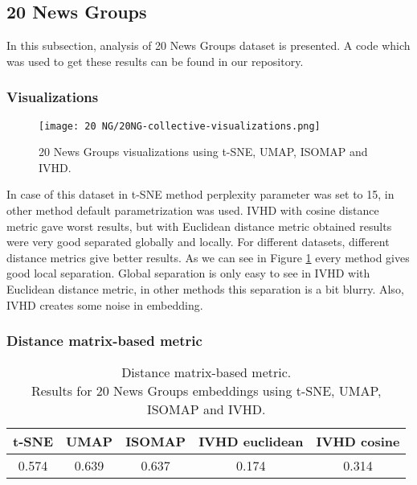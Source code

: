 \documentclass[12pt]{article}
\begin{document}
\clearpage
\subsection{20 News Groups}
In this subsection, analysis of 20 News Groups dataset is presented. A code which was used to get these results can be found in our repository\cite{github-20ng}.
\subsubsection{Visualizations}
\begin{figure}[h]
    \centering
    \texttt{[image: 20 NG/20NG-collective-visualizations.png]}
    \caption{20 News Groups visualizations using t-SNE, UMAP, ISOMAP and IVHD.}
    \label{fig:20ng_vis}
\end{figure}

\clearpage
In case of this dataset in t-SNE method perplexity parameter was set to 15, in other method default parametrization was used. IVHD with cosine distance metric gave worst results, but with Euclidean distance metric obtained results were very good separated globally and locally. For different datasets, different distance metrics give better results. As we can see in Figure \ref{fig:20ng_vis} every method gives good local separation. Global separation is only easy to see in IVHD with Euclidean distance metric, in other methods this separation is a bit blurry. Also, IVHD creates some noise in embedding.

\subsubsection{Distance matrix-based metric}
\begin{table}[h]
\centering
\caption{Distance matrix-based metric. \\ Results for 20 News Groups embeddings using t-SNE, UMAP, ISOMAP and IVHD.}
\begin{tabular}{|c|c|l|l|l|}
\hline
\textbf{t-SNE} & \textbf{UMAP} & \textbf{ISOMAP}            & \textbf{IVHD euclidean}    & \textbf{IVHD cosine}       \\ \hline
0.574          & 0.639         & \multicolumn{1}{c|}{0.637} & \multicolumn{1}{c|}{0.174} & \multicolumn{1}{c|}{0.314} \\ \hline
\end{tabular}
\end{table}
\end{document}
